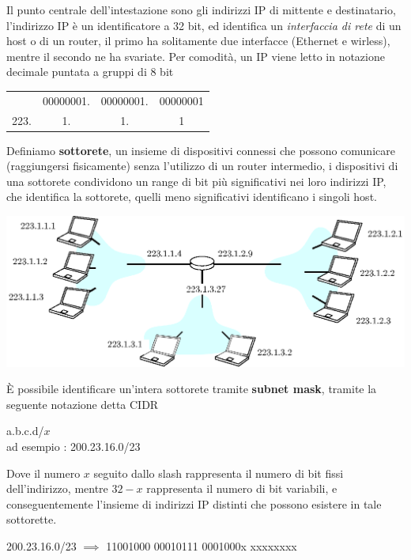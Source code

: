 \documentclass[12pt, letterpaper]{article}
\begin{document}
Il punto centrale dell'intestazione sono gli indirizzi IP di mittente e destinatario, l'indirizzo IP è un identificatore 
a 32 bit, ed identifica un \textit{interfaccia di rete} di un host o di un router, il primo ha solitamente due 
interfacce (Ethernet e wirless), mentre il secondo ne ha svariate. Per comodità, un IP viene letto 
in notazione decimale puntata a gruppi di 8 bit \begin{center}
    \begin{tabular}{cccc}
        \cellcolor[HTML]{FFFFFF}{\color[HTML]{000000} 11011111.} & 00000001. & 00000001. & \cellcolor[HTML]{FFFFFF}00000001 \\
        223.                                                     & 1.        & 1.        & 1                               
        \end{tabular}
\end{center}
Definiamo \textbf{sottorete}, un insieme di dispositivi connessi che possono comunicare (raggiungersi fisicamente) senza 
l'utilizzo di un router intermedio, i dispositivi di una sottorete condividono un range di bit più significativi nei 
loro indirizzi IP, che identifica la sottorete, quelli meno significativi identificano i singoli host.\begin{center}
    \includegraphics[width=1\textwidth ]{images/sottoreteIp.eps}
\end{center}
È possibile identificare un'intera sottorete tramite \textbf{subnet mask}, tramite la seguente notazione detta CIDR\begin{center}
    a.b.c.d/$x$ \\ 
    ad esempio : 200.23.16.0/23
\end{center}
Dove il numero $x$ seguito dallo slash rappresenta il numero di bit fissi dell'indirizzo, mentre $32-x$ rappresenta il 
numero di bit variabili, e conseguentemente l'insieme di indirizzi IP distinti che possono esistere in tale sottorette.
\begin{center}
    200.23.16.0/23 $\implies$ 11001000 00010111 0001000x xxxxxxxx
\end{center}
\end{document}

